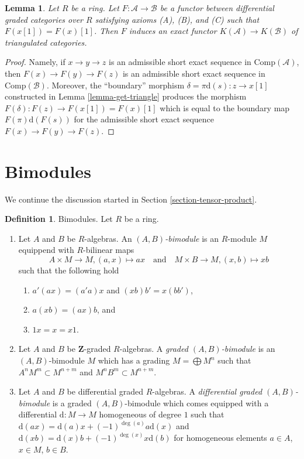 \documentclass{stacks-project}
\theoremstyle{plain}
\newtheorem{lemma}[subsection]{Lemma}
\theoremstyle{definition}
\newtheorem{definition}[subsection]{Definition}
\theoremstyle{remark}
\numberwithin{equation}{subsection}
\begin{document}
\begin{lemma}
\label{lemma-functor-between-ABC}
Let $R$ be a ring. Let $F : \mathcal{A} \to \mathcal{B}$ be a functor
between differential graded categories over $R$ satisfying axioms
(A), (B), and (C) such that $F(x[1]) = F(x)[1]$.
Then $F$ induces an exact functor
$K(\mathcal{A}) \to K(\mathcal{B})$ of triangulated categories.
\end{lemma}

\begin{proof}
Namely, if $x \to y \to z$ is an admissible short exact sequence
in $\text{Comp}(\mathcal{A})$, then $F(x) \to F(y) \to F(z)$
is an admissible short exact sequence in $\text{Comp}(\mathcal{B})$.
Moreover, the ``boundary'' morphism $\delta = \pi\text{d}(s) : z \to x[1]$
constructed in Lemma \ref{lemma-get-triangle} produces the morphism
$F(\delta) : F(z) \to F(x[1]) = F(x)[1]$ which is equal to the boundary
map $F(\pi) \text{d}(F(s))$ for the admissible short exact sequence
$F(x) \to F(y) \to F(z)$.
\end{proof}





\section{Bimodules}
\label{section-bimodules}

\noindent
We continue the discussion started in Section \ref{section-tensor-product}.

\begin{definition}
\label{definition-bimodule}
Bimodules. Let $R$ be a ring.
\begin{enumerate}
\item Let $A$ and $B$ be $R$-algebras. An {\it $(A, B)$-bimodule}
is an $R$-module $M$ equippend with $R$-bilinear maps
$$
A \times M \to M, (a, x) \mapsto ax
\quad\text{and}\quad
M \times B \to M, (x, b) \mapsto xb
$$
such that the following hold
\begin{enumerate}
\item $a'(ax) = (a'a)x$ and $(xb)b' = x(bb')$,
\item $a(xb) = (ax)b$, and
\item $1 x = x = x 1$.
\end{enumerate}
\item Let $A$ and $B$ be $\mathbf{Z}$-graded $R$-algebras. A
{\it graded $(A, B)$-bimodule} is an $(A, B)$-bimodule $M$ which
has a grading $M = \bigoplus M^n$ such that
$A^n M^m \subset M^{n + m}$ and $M^n B^m \subset M^{n + m}$.
\item Let $A$ and $B$ be differential graded $R$-algebras. A
{\it differential graded $(A, B)$-bimodule} is a graded $(A, B)$-bimodule
which comes equipped with a differential
$\text{d} : M \to M$ homogeneous of degree $1$
such that $\text{d}(ax) = \text{d}(a)x + (-1)^{\deg(a)}a\text{d}(x)$ and
$\text{d}(xb) = \text{d}(x)b + (-1)^{\deg(x)}x\text{d}(b)$
for homogeneous elements $a \in A$, $x \in M$, $b \in B$.
\end{enumerate}
\end{definition}
\end{document}

